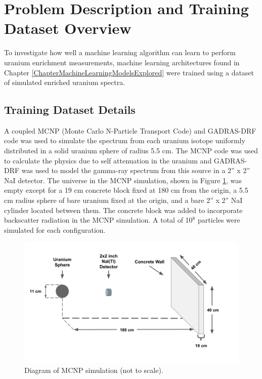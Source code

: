 \section{Problem Description and Training Dataset Overview}

To investigate how well a machine learning algorithm can learn to perform uranium enrichment measurements, machine learning architectures found in Chapter \ref{ChapterMachineLearningModelsExplored} were trained using a dataset of simulated enriched uranium spectra.



\subsection{Training Dataset Details}

A coupled MCNP (Monte Carlo N-Particle Transport Code) and GADRAS-DRF code was used to simulate the spectrum from each uranium isotope uniformly distributed in a solid uranium sphere of radius 5.5 cm. The MCNP code was used to calculate the physics due to self attenuation in the uranium and GADRAS-DRF was used to model the gamma-ray spectrum from this source in a 2'' x 2'' NaI detector. The universe in the MCNP simulation, shown in Figure \ref{fig:mcnp_diagram}, was empty except for a 19 cm concrete block fixed at 180 cm from the origin, a 5.5 cm radius sphere of bare uranium fixed at the origin, and a bare 2'' x 2'' NaI cylinder located between them. The concrete block was added to incorporate backscatter radiation in the MCNP simulation. A total of 10$^{8}$ particles were simulated for each configuration.

\begin{figure}[H]
	\centering
    \includegraphics[trim=50 50 50 50,clip,width=0.99\linewidth]{images/mcnp_diagram.png}
	\caption{Diagram of MCNP simulation (not to scale).}
	\label{fig:mcnp_diagram}
\end{figure}

